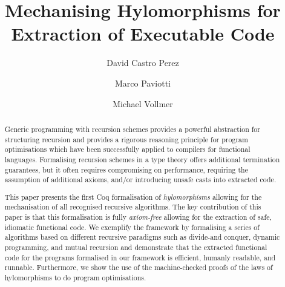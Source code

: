 \documentclass[a4paper,anonymous, UKenglish,cleveref, autoref, thm-restate]{lipics-v2021}
\title{Mechanising Hylomorphisms for Extraction of Executable Code}
\author{David {Castro Perez}}%
{University Of Kent, Canterbury, CT2 7NZ, United Kingdom}%
{D.Castro-Perez@kent.ac.uk}%
{0000-0002-6939-4189}%
{}
\author{Marco Paviotti}%
{University Of Kent, Canterbury, CT2 7NZ, United Kingdom}%
{M.Paviotti@kent.ac.uk}%
{0000-0002-1513-0807}%
{}
\author{Michael Vollmer}%
{University Of Kent, Canterbury, CT2 7NZ, United Kingdom}%
{M.Vollmer@kent.ac.uk}%
{0000-0002-0496-8268}%
{}
\begin{document}
\maketitle

\begin{abstract}
  Generic programming with recursion schemes provides a powerful abstraction for
  structuring recursion and provides a rigorous reasoning principle for program
  optimisations which have been successfully applied to compilers for functional
  languages. Formalising recursion schemes in a type theory offers additional
  termination guarantees, but it often requires compromising on performance,
  requiring the assumption of additional axioms, and/or introducing unsafe casts
  into extracted code.

  This paper presents the first Coq formalisation of \emph{hylomorphisms}
  allowing for the mechanisation of all recognised recursive algorithms. The key
  contribution of this paper is that this formalisation is fully
  \emph{axiom-free} allowing for the extraction of safe, idiomatic functional
  code. We exemplify the framework by formalising a series of algorithms based
  on different recursive paradigms such as divide-and conquer, dynamic
  programming, and mutual recursion and demonstrate that the extracted
  functional code for the programs formalised in our framework is efficient,
  humanly readable, and runnable. Furthermore, we show the use of the
  machine-checked proofs of the laws of hylomorphisms to do program
  optimisations.
\end{abstract}
\end{document}
